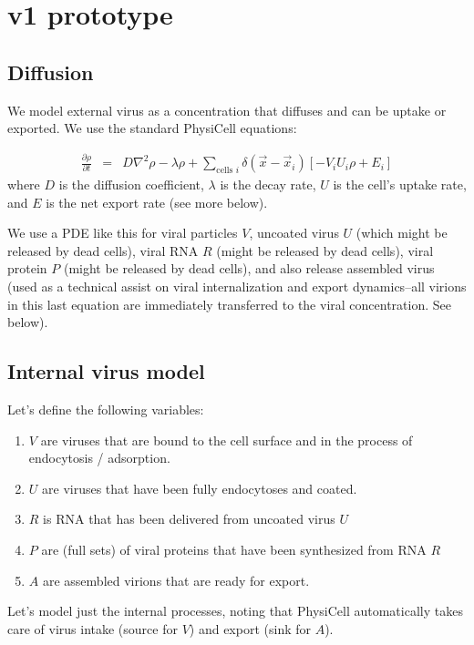 \documentclass[12point]{article}
\begin{document}
\section{v1 prototype}

\subsection{Diffusion}
We model external virus as a concentration that diffuses and can be uptake or exported. We use the standard PhysiCell equations: 

\begin{eqnarray}
\frac{\partial \rho }{\partial t} & = & 
D \nabla^2 \rho - \lambda \rho + 
\sum_{\textrm{cells }i} 
\delta( \vec{x} - \vec{x}_i ) \left[ 
-V_i U_i \rho + E_i 
\right]
\end{eqnarray}
where $D$ is the diffusion coefficient, $\lambda$ is the decay rate, $U$ is the cell's uptake rate, and $E$ is the net export rate (see more below). 

We use a PDE like this for viral particles $V$, uncoated virus $U$ (which might be released by dead cells), viral RNA $R$ (might be released by dead cells), viral protein $P$ (might be released by dead cells), and also 
release assembled virus (used as a technical assist on viral internalization and export dynamics--all virions in this last equation are immediately transferred to the viral concentration. See below). 

\subsection{Internal virus model}
Let's define the following variables: 
\begin{enumerate}
\item 
$V$ are viruses that are bound to the cell surface and in the process of endocytosis / adsorption. 

\item 
$U$ are viruses that have been fully endocytoses and coated. 

\item 
$R$ is RNA that has been delivered from uncoated virus $U$

\item 
$P$ are (full sets) of viral proteins that have been synthesized from RNA $R$

\item 
$A$ are assembled virions that are ready for export. 

\end{enumerate}
Let's model just the internal processes, noting that PhysiCell automatically takes care of virus intake (source for $V$) and export (sink for $A$). 
\end{document}
